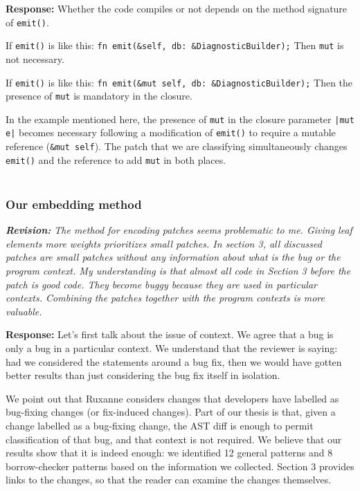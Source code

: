 \documentclass{article}
\begin{document}
\textbf{Response:} Whether the code compiles or not depends on the method signature of \verb+emit()+.

If \verb+emit()+ is like this:
    \verb+fn emit(&self, db: &DiagnosticBuilder);+
Then \verb+mut+  is not necessary.

If \verb+emit()+ is like this:
    \verb+fn emit(&mut self, db: &DiagnosticBuilder);+
Then the presence of \verb+mut+ is mandatory in the closure. 

In the example mentioned here, the presence of \verb+mut+ in the closure parameter \verb+|mut e|+ becomes necessary following a modification of \verb+emit()+ to require a mutable reference (\verb+&mut self+). The patch that we are classifying simultaneously changes \verb+emit()+ and the reference to add \verb+mut+ in both places. \\ \\

\subsubsection{Our embedding method}

\textit{\textbf{Revision:} The method for encoding patches seems problematic to me. Giving leaf elements more weights prioritizes small patches. In section 3, all discussed patches are small patches without any information about what is the bug or the program context. My understanding is that almost all code in Section 3 before the patch is good code. They become buggy because they are used in particular contexts. Combining the patches together with the program contexts is more valuable.}

\textbf{Response:} Let's first talk about the issue of context. We agree that a bug is only a bug in a particular context. We understand that the reviewer is saying: had we considered the statements around a bug fix, then we would have gotten better results than just considering the bug fix itself in isolation. 

We point out that Ruxanne considers changes that developers have labelled as bug-fixing changes (or fix-induced changes). Part of our thesis is that, given a change labelled as a bug-fixing change, the AST diff is enough to permit classification of that bug, and that context is not required. We believe that our results show that it is indeed enough: we identified 12 general patterns and 8 borrow-checker patterns based on the information we collected.  Section 3 provides links to the changes, so that the reader can examine the changes themselves. 
\end{document}
